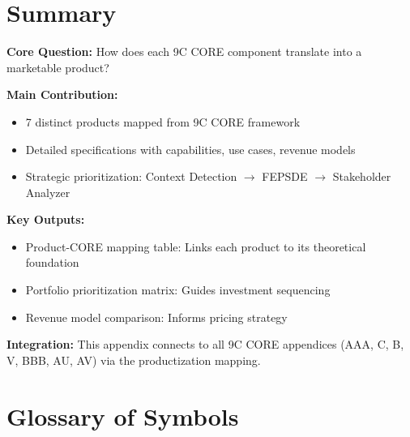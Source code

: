 
\section{Summary}
\label{sec:vvv3-summary}

\begin{tcolorbox}[colback=green!10!white, colframe=green!75!black,
    title=\textbf{Appendix VVV.3: Summary}]

\textbf{Core Question:} How does each 9C CORE component translate into a marketable product?

\textbf{Main Contribution:}
\begin{itemize}[nosep]
    \item 7 distinct products mapped from 9C CORE framework
    \item Detailed specifications with capabilities, use cases, revenue models
    \item Strategic prioritization: Context Detection $\to$ FEPSDE $\to$ Stakeholder Analyzer
\end{itemize}

\textbf{Key Outputs:}
\begin{itemize}[nosep]
    \item Product-CORE mapping table: Links each product to its theoretical foundation
    \item Portfolio prioritization matrix: Guides investment sequencing
    \item Revenue model comparison: Informs pricing strategy
\end{itemize}

\textbf{Integration:} This appendix connects to all 9C CORE appendices (AAA, C, B, V, BBB, AU, AV) via the productization mapping.

\end{tcolorbox}


\section{Glossary of Symbols}
\label{sec:vvv3-glossary}

